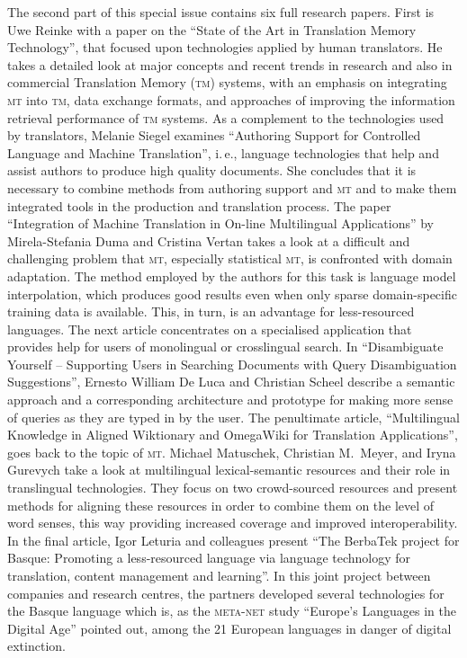 \documentclass[output=paper]{LSP/langsci}
\begin{document}
The second part of this special issue contains six full research
papers. First is Uwe Reinke with a paper on the ``State of the Art
in Translation Memory Technology'', that focused upon technologies
applied by human translators. He takes a detailed look at major
concepts and recent trends in research and also in commercial Translation Memory (\textsc{tm})
systems, with an emphasis on integrating \textsc{mt} into \textsc{tm}, data exchange
formats, and approaches of improving the information retrieval
performance of \textsc{tm} systems. As a complement to the technologies used by
translators, Melanie Siegel examines ``Authoring Support for
Controlled Language and Machine Translation'', i.\,e., language
technologies that help and assist authors to produce high quality
documents. She concludes that it is necessary to combine methods
from authoring support and \textsc{mt} and to make them integrated tools in the
production and translation process. The paper ``Integration of Machine
Translation in On-line Multilingual Applications'' by Mirela-Stefania
Duma and Cristina Vertan takes a look at a difficult and challenging
problem that \textsc{mt}, especially statistical \textsc{mt}, is confronted with domain
adaptation. The method employed by the authors for this task is
language model interpolation, which produces good results even when
only sparse domain-specific training data is available. This, in turn,
is an advantage for less-resourced languages. The next article
concentrates on a specialised application that provides help for users
of monolingual or crosslingual search. In ``Disambiguate Yourself --
Supporting Users in Searching Documents with Query Disambiguation
Suggestions'', Ernesto William De Luca and Christian Scheel describe a
semantic approach and a corresponding architecture and prototype for
making more sense of queries as they are typed in by the user. The
penultimate article, ``Multilingual Knowledge in Aligned Wiktionary
and OmegaWiki for Translation Applications'', goes back to the topic
of \textsc{mt}. Michael Matuschek, Christian M.~Meyer, and Iryna Gurevych take
a look at multilingual lexical-semantic resources and their role in translingual technologies. They focus on two crowd-sourced
resources and present methods for aligning these resources in order to
combine them on the level of word senses, this way providing increased
coverage and improved interoperability. In the final article, Igor
Leturia and colleagues present ``The BerbaTek project for Basque:
Promoting a less-resourced language via language technology for
translation, content management and learning''. In this joint project
between companies and research centres, the partners developed several
technologies for the Basque language which is, as the \textsc{meta-net} study
``Europe's Languages in the Digital Age'' pointed out, among the 21
European languages in danger of digital extinction.
\end{document}
